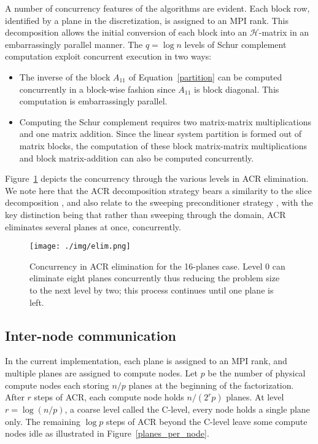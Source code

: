 \documentclass[]{elsarticle}
\begin{document}
A number of concurrency features of the algorithms are evident. Each block row, identified by a plane in the discretization, is assigned to an MPI rank. This decomposition allows the initial conversion of each block into an $\mathcal{H}$-matrix in an embarrassingly parallel manner. The $q = \log n$ levels of Schur complement computation exploit concurrent execution in two ways:

\begin{itemize}
  \item The inverse of the block $A_{11}$ of Equation~\ref{partition} can be computed concurrently in a block-wise fashion since $A_{11}$ is block diagonal. This computation is embarrassingly parallel.
  \item Computing the Schur complement requires two matrix-matrix multiplications and one matrix addition. Since the linear system partition is formed out of matrix blocks, the computation of these block matrix-matrix multiplications and block matrix-addition can also be computed concurrently.
\end{itemize}

Figure~\ref{fig:concurrency} depicts the concurrency through the various levels in ACR elimination. We note here that the ACR decomposition strategy bears a similarity to the slice decomposition \cite{gugist2001}, and also relate to the sweeping preconditioner strategy \cite{engquist2011sweeping}, with the key distinction being that rather than sweeping through the domain, ACR eliminates several planes at once, concurrently. 

\begin{figure}[H]
\centering
\texttt{[image: ./img/elim.png]}
\caption{Concurrency in ACR elimination for the 16-planes case. Level 0 can eliminate eight planes concurrently thus reducing the problem size to the next level by two; this process continues until one plane is left.}
\label{fig:concurrency}
\end{figure}

\subsection{Inter-node communication}

In the current implementation, each plane is assigned to an MPI rank, and multiple planes are assigned to compute nodes. Let $p$ be the number of physical compute nodes each storing $n/p$ planes at the beginning of the factorization. After $r$ steps of ACR, each compute node holds $n/(2^r p)$ planes. At level $r = \log (n/p)$, a coarse level called the C-level, every node holds a single plane only. The remaining  $\log p$ steps of ACR beyond the C-level leave some compute nodes idle as illustrated in Figure~\ref{planes_per_node}.
\end{document}
